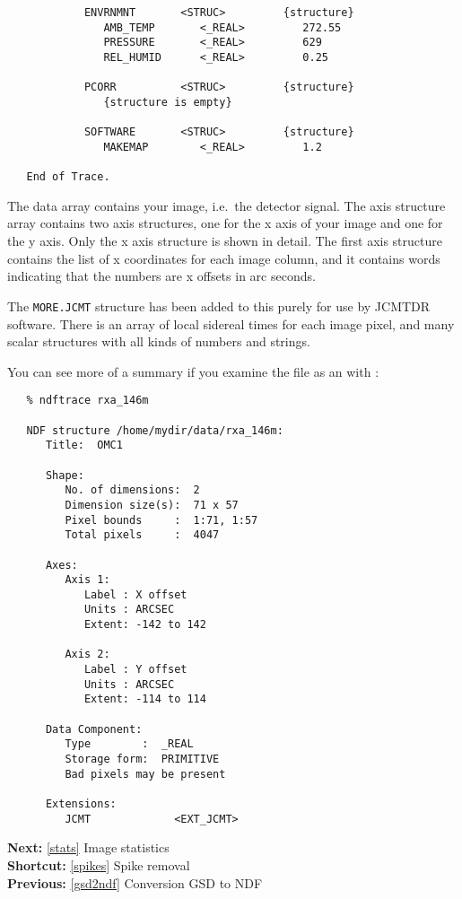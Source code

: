 \begin{verbatim}
            ENVRNMNT       <STRUC>         {structure}
               AMB_TEMP       <_REAL>         272.55
               PRESSURE       <_REAL>         629
               REL_HUMID      <_REAL>         0.25

            PCORR          <STRUC>         {structure}
               {structure is empty}

            SOFTWARE       <STRUC>         {structure}
               MAKEMAP        <_REAL>         1.2

   End of Trace.
\end{verbatim}

   The data array contains your image, i.e.\ the detector signal. The axis
   structure array contains two axis structures, one for the x axis of your
   image and one for the y axis. Only the x axis structure is shown in
   detail. The first axis structure contains the list of x coordinates
   for each image column, and it contains words indicating that the
   numbers are x offsets in arc seconds.

   The {\tt MORE.JCMT} structure has been added to this purely for use
   by JCMTDR software. There is an array of local sidereal times for each
   image pixel, and many scalar structures with all kinds of numbers and
   strings.

   You can see more of a summary if you examine the file as an
   with
{\tt {}}:

\begin{verbatim}
   % ndftrace rxa_146m

   NDF structure /home/mydir/data/rxa_146m:
      Title:  OMC1

      Shape:
         No. of dimensions:  2
         Dimension size(s):  71 x 57
         Pixel bounds     :  1:71, 1:57
         Total pixels     :  4047

      Axes:
         Axis 1:
            Label : X offset
            Units : ARCSEC
            Extent: -142 to 142

         Axis 2:
            Label : Y offset
            Units : ARCSEC
            Extent: -114 to 114

      Data Component:
         Type        :  _REAL
         Storage form:  PRIMITIVE
         Bad pixels may be present

      Extensions:
         JCMT             <EXT_JCMT>
\end{verbatim}

\begin{latexonly}
{\bf Next:} \ref{stats} Image statistics\\
{\bf Shortcut:} \ref{spikes} Spike removal\\
{\bf Previous:} \ref{gsd2ndf} Conversion GSD to NDF\\
\end{latexonly}

